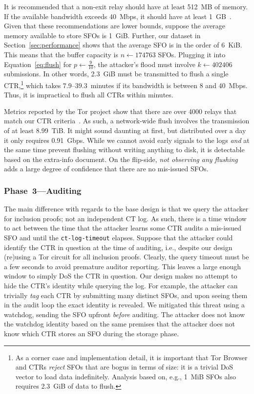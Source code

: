 It is recommended that a non-exit relay should have at least 512~MB of memory.
If the available bandwidth exceeds 40~Mbps, it should have at least
1~GB~\cite{relay-config}.  Given that these recommendations are lower bounds,
suppose the average memory available to store SFOs is 1~GiB.  Further, our
dataset in Section~\ref{sec:performance} shows that the average SFO is in the
order of 6~KiB.  This means that the buffer capacity is $n \gets 174763$ SFOs.
Plugging it into Equation~\ref{eq:flush} for $p \gets \frac{9}{10}$, the
attacker's flood must involve $k \gets 402406$ submissions.  In other words,
2.3~GiB must be transmitted to flush a single CTR,\footnote{%
	As a corner case and implementation detail, it is important that Tor Browser
	and CTRs \emph{reject} SFOs that are bogus in terms of size:
		it is a trivial DoS vector to load data indefinitely.
	Analysis based on, e.g., 1~MiB SFOs also requires 2.3~GiB of data to flush.
} which takes $7.9$--$39.3$~minutes if its bandwidth is between 8 and 40~Mbps.
Thus, it is impractical to flush all CTRs within minutes.

Metrics reported by the Tor project show that there are over 4000 relays that
match our CTR criteria~\cite{relay-by-flag}.  As such, a network-wide flush
involves the transmission of at least 8.99~TiB.  It might sound daunting at
first, but distributed over a day it only requires 0.91~Gbps.  While we cannot
avoid early signals to the logs \emph{and} at the same time prevent flushing
without writing anything to disk, it is detectable based on the extra-info
document.  On the flip-side, \emph{not observing any flushing} adds a large
degree of confidence that there are no mis-issued SFOs.

\subsubsection{Phase~3---Auditing} \label{sec:auditor:analysis:phase3}
The main difference with regards to the base design is that we query the
attacker for inclusion proofs; not an independent CT log.  As such, there is a
time window to act between the time that the attacker learns some CTR audits a
mis-issued SFO and until the \texttt{ct-log-timeout} elapses.  Suppose that the
attacker could identify the CTR in question at the time of auditing, i.e.,
despite our design (re)using a Tor circuit for all inclusion proofs.  Clearly,
the query timeout must be a few seconds to avoid premature auditor reporting.
This leaves a large enough window to simply DoS the CTR in question.  Our design
makes no attempt to hide the CTR's identity while querying the log.  For
example, the attacker can trivially \emph{tag} each CTR by submitting many
distinct SFOs, and upon seeing them in the audit loop the exact identity is
revealed.  We mitigated this threat using a watchdog, sending the SFO upfront
\emph{before} auditing.  The attacker does not know the watchdog identity based
on the same premises that the attacker does not know which CTR stores an
SFO during the storage phase.


